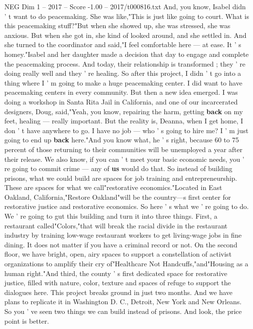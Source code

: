 \begin{textsample}{NEG Dim 1 – 2017 – Score -1.00 – 2017/t000816.txt}
And, you know, Isabel didn ' t want to do peacemaking.
She was like,"This is just like going to court.
What is this peacemaking stuff?"But when she showed up, she was stressed, she was anxious.
But when she got in, she kind of looked around, and she settled in.
And she turned to the coordinator and said,"I feel comfortable here — at ease.
It ' s homey."Isabel and her daughter made a decision that day to engage and complete the peacemaking process.
And today, their relationship is transformed ; they ' re doing really well and they ' re healing.
So after this project, I didn ' t go into a thing where I ' m going to make a huge peacemaking center.
I did want to have peacemaking centers in every community.
But then a new idea emerged.
I was doing a workshop in Santa Rita Jail in California, and one of our incarcerated designers, Doug, said,"Yeah, you know, repairing the harm, getting \textbf{back} on my feet, healing — really important.
But the reality is, Deanna, when I get home, I don ' t have anywhere to go.
I have no job — who ' s going to hire me?
I ' m just going to end up \textbf{back} here."And you know what, he ' s right, because 60 to 75 percent of those returning to their communities will be unemployed a year after their release.
We also know, if you can ' t meet your basic economic needs, you ' re going to commit crime — any of \textbf{us} would do that.
So instead of building prisons, what we could build are spaces for job training and entrepreneurship.
These are spaces for what we call"restorative economics."Located in East Oakland, California,"Restore Oakland"will be the country—s first center for restorative justice and restorative economics.
So here ' s what we ' re going to do.
We ' re going to gut this building and turn it into three things.
First, a restaurant called"Colors,"that will break the racial divide in the restaurant industry by training low-wage restaurant workers to get living-wage jobs in fine dining.
It does not matter if you have a criminal record or not.
On the second floor, we have bright, open, airy spaces to support a constellation of activist organizations to amplify their cry of"Healthcare Not Handcuffs,"and"Housing as a human right."And third, the county ' s first dedicated space for restorative justice, filled with nature, color, texture and spaces of refuge to support the dialogues here.
This project breaks ground in just two months.
And we have plans to replicate it in Washington D.
C., Detroit, New York and New Orleans.
So you ' ve seen two things we can build instead of prisons.
And look, the price point is better.

\end{textsample}
